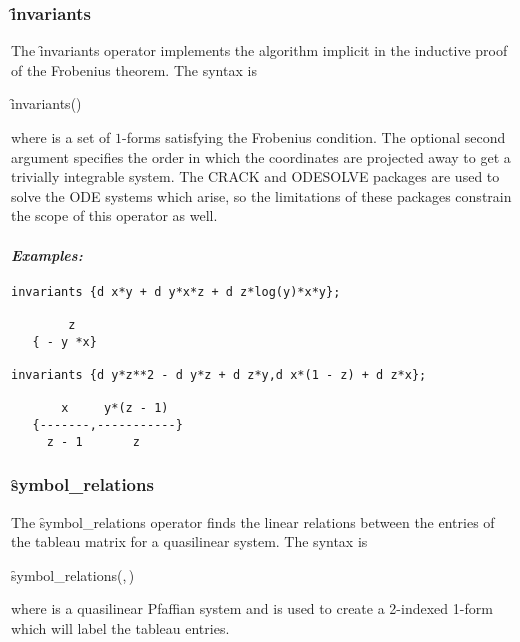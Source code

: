 \subsubsection{\f{invariants}}
\label{invariants}

\hypertarget{operator:INVARIANTS}{}
The \f{invariants} operator implements the algorithm implicit in the
inductive proof of the Frobenius theorem. The syntax is
\begin{syntax}
	\f{invariants}()
\end{syntax}
where  is a set of $1$-forms satisfying the Frobenius condition.
The optional second argument specifies the order in which the coordinates
are projected away to get a trivially integrable system.  The CRACK and
ODESOLVE packages are used to solve the ODE systems which arise, so the
limitations of these packages constrain the scope of this operator as well.

\paragraph{\textit{Examples:}}
\begin{verbatim}
invariants {d x*y + d y*x*z + d z*log(y)*x*y};

        z
   { - y *x}

invariants {d y*z**2 - d y*z + d z*y,d x*(1 - z) + d z*x};

       x     y*(z - 1)
   {-------,-----------}
     z - 1       z
\end{verbatim}


\subsubsection{\f{symbol\_relations}}
\label{symbol_relations}

\hypertarget{operator:SYMBOL_RELATIONS}{}
The \f{symbol\_relations} operator finds the linear relations between the
entries of the tableau matrix for a quasilinear system. The syntax is
\begin{syntax}
  \f{symbol\_relations}(,\,)
\end{syntax}
where  is a quasilinear Pfaffian system and  is
used to create a 2-indexed 1-form which will label the tableau entries.

